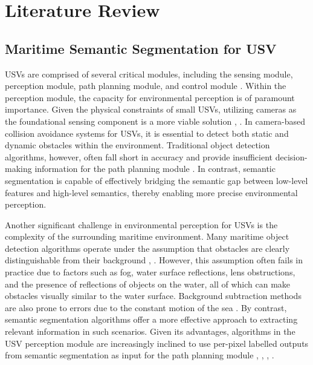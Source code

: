 \section{Literature Review}
\label{section:LR}
\subsection{Maritime Semantic Segmentation for USV}
USVs are comprised of several critical modules, including the sensing module, perception module, path planning 
module, and control module \cite{MODS}. Within the perception module, the capacity for environmental perception 
is of paramount importance. Given the physical constraints of small USVs, utilizing cameras as the foundational 
sensing component is a more viable solution \cite{lightsensor1}, \cite{lightsensor2}. In camera-based collision 
avoidance systems for USVs, it is essential to detect both static and dynamic obstacles within the environment. 
Traditional object detection algorithms, however, often fall short in accuracy and provide insufficient 
decision-making information for the path planning module \cite{SSsurvey}. In contrast, semantic segmentation is 
capable of effectively bridging the semantic gap between low-level features and high-level semantics, thereby 
enabling more precise environmental perception.

Another significant challenge in environmental perception for USVs is the complexity of the surrounding 
maritime environment. Many maritime object detection algorithms operate under the assumption that obstacles 
are clearly distinguishable from their background \cite{marineobjdetect1}, \cite{marineobjdetect2}. However, this 
assumption often fails in practice due to factors such as fog, water surface reflections, lens obstructions, 
and the presence of reflections of objects on the water, all of which can make obstacles visually similar 
to the water surface. Background subtraction methods are also prone to errors due to the constant motion of 
the sea \cite{backsub}. By contrast, semantic segmentation algorithms offer a more effective approach to 
extracting relevant information in such scenarios. Given its advantages, algorithms in the USV perception 
module are increasingly inclined to use per-pixel labelled outputs from semantic segmentation as input for 
the path planning module \cite{MODS}, \cite{WaSR}, \cite{MaSTr1325}, \cite{MODD2}.

